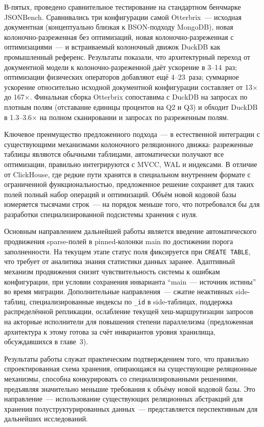 В-пятых, проведено сравнительное тестирование на стандартном
бенчмарке JSONBench. Сравнивались три конфигурации самой
Otterbrix~--- исходная документная (концептуально близкая к
BSON-подходу MongoDB), новая колоночно-разреженная без
оптимизаций, новая колоночно-разреженная с оптимизациями~--- и
встраиваемый колоночный движок DuckDB как промышленный референс.
Результаты показали, что архитектурный переход от документной
модели к колоночно-разреженной даёт ускорение в 3--14~раз;
оптимизации физических операторов добавляют ещё 4--23~раза;
суммарное ускорение относительно исходной документной
конфигурации составляет от 13$\times$ до 167$\times$. Финальная
сборка Otterbrix сопоставима с DuckDB на запросах по плотным
полям (отставание единицы процентов на Q2 и Q3) и обходит DuckDB
в 1.3--3.6$\times$ на полном сканировании и запросах по разреженным
полям.

Ключевое преимущество предложенного подхода~--- в естественной
интеграции с существующими механизмами колоночного реляционного
движка: разреженные таблицы являются обычными таблицами,
автоматически получают все оптимизации, правильно интегрируются с
MVCC, WAL и индексами. В отличие от ClickHouse, где редкие пути
хранятся в специальном внутреннем формате с ограниченной
функциональностью, предложенное решение сохраняет для таких полей
полный набор операций и оптимизаций. Объём новой кодовой базы
измеряется тысячами строк~--- на порядок меньше того, что
потребовался бы для разработки специализированной подсистемы
хранения с нуля.

Основным направлением дальнейшей работы является введение
автоматического продвижения sparse-полей в pinned-колонки main по
достижении порога заполненности. На текущем этапе статус поля
фиксируется при \texttt{CREATE TABLE}, что требует от аналитика
знания статистики данных заранее. Адаптивный механизм продвижения
снизит чувствительность системы к ошибкам конфигурации, при
условии сохранения инварианта ``main~--- источник истины'' во
время миграции. Дополнительные направления~--- сжатие неактивных
side-таблиц, специализированные индексы по \texttt{\_id} в
side-таблицах, поддержка распределённой репликации, ослабление
текущей хеш-маршрутизации запросов на акторные исполнители для
повышения степени параллелизма (предложенная архитектура к этому
готова за счёт инвариантов уровня хранилища, обсуждавшихся в
главе~3).

Результаты работы служат практическим подтверждением того, что
правильно спроектированная схема хранения, опирающаяся на
существующие реляционные механизмы, способна конкурировать со
специализированными решениями, предъявляя значительно меньшие
требования к объёму новой кодовой базы. Это направление~---
использование существующих реляционных абстракций для хранения
полуструктурированных данных~--- представляется перспективным для
дальнейших исследований.
